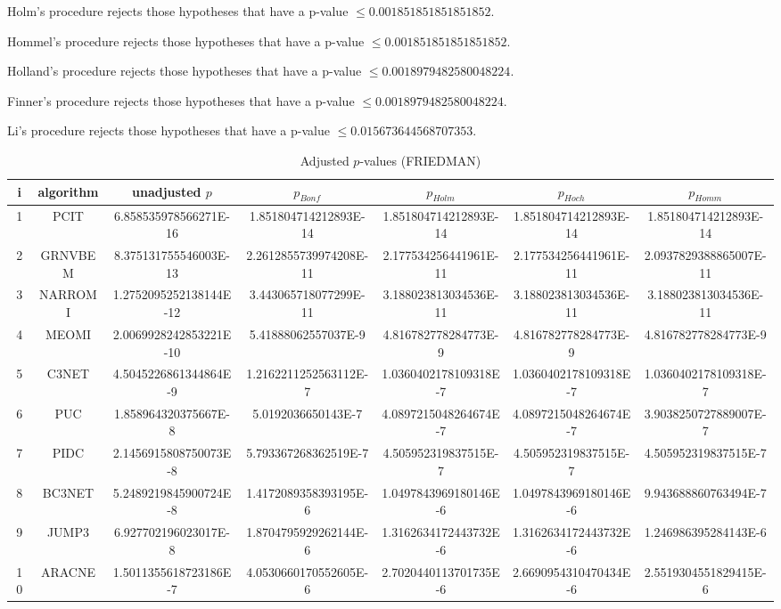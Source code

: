 \documentclass[a4paper,10pt]{article}
\begin{document}
\begin{landscape}
Holm's procedure rejects those hypotheses that have a p-value $\le0.001851851851851852$.


Hommel's procedure rejects those hypotheses that have a p-value $\le0.001851851851851852$.


Holland's procedure rejects those hypotheses that have a p-value $\le0.0018979482580048224$.


Finner's procedure rejects those hypotheses that have a p-value $\le0.0018979482580048224$.


Li's procedure rejects those hypotheses that have a p-value $\le0.015673644568707353$.



\newpage

\begin{table}[!htp]
\centering\scriptsize
\caption{Adjusted $p$-values (FRIEDMAN)}
\begin{tabular}{ccccccc}
i&algorithm&unadjusted $p$&$p_{Bonf}$&$p_{Holm}$&$p_{Hoch}$&$p_{Homm}$\\
\hline
1&PCIT&6.858535978566271E-16&1.851804714212893E-14&1.851804714212893E-14&1.851804714212893E-14&1.851804714212893E-14\\
2&GRNVBEM&8.375131755546003E-13&2.2612855739974208E-11&2.177534256441961E-11&2.177534256441961E-11&2.0937829388865007E-11\\
3&NARROMI&1.2752095252138144E-12&3.443065718077299E-11&3.188023813034536E-11&3.188023813034536E-11&3.188023813034536E-11\\
4&MEOMI&2.0069928242853221E-10&5.41888062557037E-9&4.816782778284773E-9&4.816782778284773E-9&4.816782778284773E-9\\
5&C3NET&4.5045226861344864E-9&1.2162211252563112E-7&1.0360402178109318E-7&1.0360402178109318E-7&1.0360402178109318E-7\\
6&PUC&1.858964320375667E-8&5.0192036650143E-7&4.0897215048264674E-7&4.0897215048264674E-7&3.9038250727889007E-7\\
7&PIDC&2.1456915808750073E-8&5.793367268362519E-7&4.505952319837515E-7&4.505952319837515E-7&4.505952319837515E-7\\
8&BC3NET&5.2489219845900724E-8&1.4172089358393195E-6&1.0497843969180146E-6&1.0497843969180146E-6&9.943688860763494E-7\\
9&JUMP3&6.927702196023017E-8&1.8704795929262144E-6&1.3162634172443732E-6&1.3162634172443732E-6&1.246986395284143E-6\\
10&ARACNE&1.5011355618723186E-7&4.0530660170552605E-6&2.7020440113701735E-6&2.6690954310470434E-6&2.5519304551829415E-6\\

\end{tabular}
\end{table}
\end{landscape}
\end{document}
